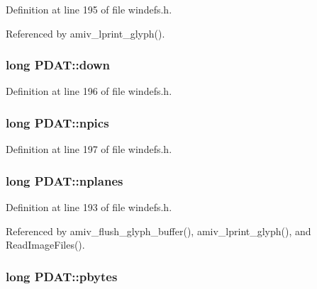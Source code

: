 Definition at line 195 of file windefs.\+h.



Referenced by amiv\+\_\+lprint\+\_\+glyph().

\hypertarget{structPDAT_ad6718ab3ccd6376e55ed5cc672494a7e}{
\subsubsection[{down}]{\setlength{\rightskip}{0pt plus 5cm}long P\+D\+A\+T\+::down}}\label{structPDAT_ad6718ab3ccd6376e55ed5cc672494a7e}


Definition at line 196 of file windefs.\+h.

\hypertarget{structPDAT_a31146df1ae9c5d9117c669cd516b41ed}{
\subsubsection[{npics}]{\setlength{\rightskip}{0pt plus 5cm}long P\+D\+A\+T\+::npics}}\label{structPDAT_a31146df1ae9c5d9117c669cd516b41ed}


Definition at line 197 of file windefs.\+h.

\hypertarget{structPDAT_a65023668c3da18118ec0f30379454fa0}{
\subsubsection[{nplanes}]{\setlength{\rightskip}{0pt plus 5cm}long P\+D\+A\+T\+::nplanes}}\label{structPDAT_a65023668c3da18118ec0f30379454fa0}


Definition at line 193 of file windefs.\+h.



Referenced by amiv\+\_\+flush\+\_\+glyph\+\_\+buffer(), amiv\+\_\+lprint\+\_\+glyph(), and Read\+Image\+Files().

\hypertarget{structPDAT_ad37e390e86892790b8784ce46a0e49bd}{
\subsubsection[{pbytes}]{\setlength{\rightskip}{0pt plus 5cm}long P\+D\+A\+T\+::pbytes}}\label{structPDAT_ad37e390e86892790b8784ce46a0e49bd}


